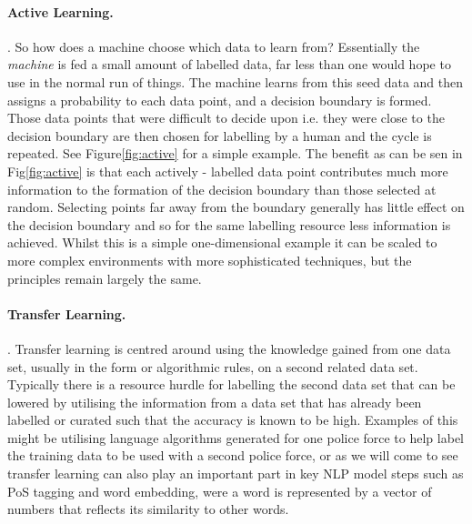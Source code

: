 \paragraph{Active Learning.}   \parencite{settles2009active}. So how does a machine choose which data to learn from? Essentially the \emph{machine} is fed a small amount of labelled data, far less than one would hope to use in the normal run of things. The machine learns from this seed data and then assigns a probability to each data point, and a decision boundary is formed.  Those data points that were difficult to decide upon i.e. they were close to the decision boundary are then chosen for labelling by a human and the cycle is repeated. See Figure\ref{fig:active} for a simple example. The benefit as can be sen in Fig\ref{fig:active} is that each actively - labelled data point contributes much more information to the formation of the decision boundary than those selected at random. Selecting points far away from the boundary generally has little effect on the decision boundary and so for the same labelling resource less information is achieved. Whilst this is a simple one-dimensional example it can be scaled to more complex environments with more sophisticated techniques, but the principles remain largely the same.

\paragraph{Transfer Learning.}  \parencite{weiss2016survey,}. Transfer learning is centred around using the knowledge gained from one data set, usually in the form or algorithmic rules, on a second related data set. Typically there is a resource hurdle for labelling the second data set that can be lowered by utilising the information from a data set that has already been labelled or curated such that the accuracy is known to be high. Examples of this might be utilising language algorithms generated for one police force to help label the training data to be used with a second police force, or as we will come to see transfer learning can also play an important part in key NLP model steps such as PoS tagging and word embedding, were a word is represented by a vector of numbers that reflects its similarity to other words.


